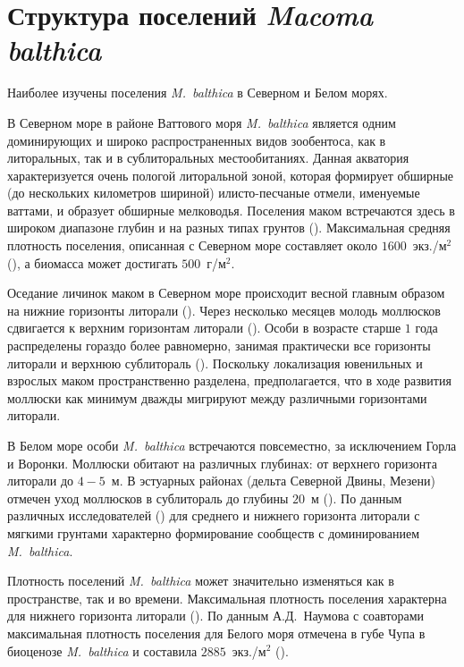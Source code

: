 		\section{Структура поселений {\it Macoma balthica}}

Наиболее изучены поселения \textit{M.~balthica} в Северном и Белом морях.

В Северном море в районе Ваттового моря \textit{M.~balthica} является одним доминирующих и широко распространенных видов зообентоса, как в литоральных, так и в сублиторальных местообитаниях.
Данная акватория характеризуется очень пологой литоральной зоной, которая формирует обширные (до нескольких километров шириной) илисто-песчаные отмели, именуемые ваттами, и образует обширные мелководья. 
Поселения маком встречаются здесь в широком диапазоне глубин и на разных типах грунтов (\cite{Beukema_et_al_1993, Hiddink_et_al_2002_predation_infauna, Hiddink_et_al_2002_predation_epifauna, Hiddink_2003}).
Максимальная средняя плотность поселения, описанная с Северном море составляет около $1600$~экз./м$^2$ (\cite{Reading_1979}), а биомасса может достигать $500$~г/м$^2$.

Оседание личинок маком в Северном море происходит весной главным образом на нижние горизонты литорали (\cite{Strasser_Gunter_2001}). 
Через несколько месяцев молодь моллюсков сдвигается к верхним горизонтам литорали (\cite{Armonies_Hellwig-Armonies_1992}). 
Особи в возрасте старше $1$ года распределены гораздо более равномерно, занимая практически все горизонты литорали и верхнюю сублитораль (\cite{Beukema_et_al_1993}). Поскольку локализация ювенильных и взрослых маком пространственно разделена, предполагается, что в ходе развития моллюски как минимум дважды мигрируют между различными горизонтами литорали. 


В Белом море особи \textit{M.~balthica} встречаются  повсеместно, за исключением Горла и Воронки. 
Моллюски обитают на различных глубинах: от верхнего горизонта литорали до  $4-5$~м. 
В эстуарных районах (дельта Северной Двины, Мезени) отмечен уход моллюсков в сублитораль до глубины $20$~м (\cite{Semenova_1974, Naumov_2006}).
По данным различных исследователей (\cite{Babkov_Golikov_1984, Naumov_2006}) для среднего и нижнего горизонта литорали с мягкими грунтами характерно формирование сообществ с доминированием \textit{M.~balthica}. 

Плотность поселений \textit{M.~balthica} может значительно изменяться как в пространстве, так и во времени. 
Максимальная плотность поселения характерна для нижнего горизонта литорали (\cite{Semenova_1974, Maximovich_et_al_1991}). 
По данным А.\:Д.~Наумова с соавторами максимальная плотность поселения для Белого моря отмечена в губе Чупа в биоценозе \textit{M.~balthica} и составила $2885$~экз./м$^2$ (\cite{Naumov_2006}).

